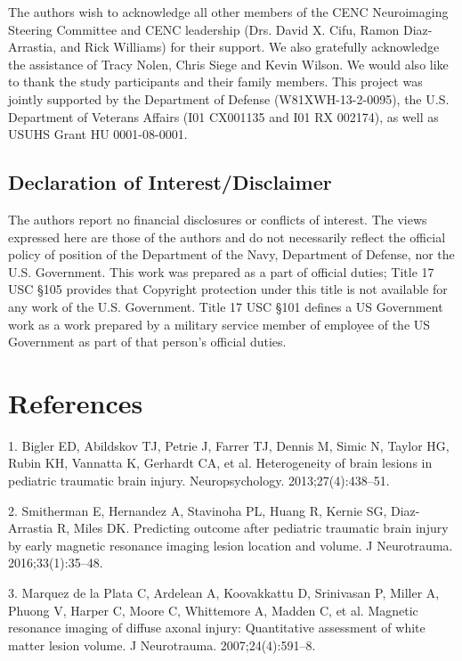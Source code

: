 \documentclass[11pt,]{article}
\begin{document}
The authors wish to acknowledge all other members of the CENC
Neuroimaging Steering Committee and CENC leadership (Drs. David X. Cifu,
Ramon Diaz-Arrastia, and Rick Williams) for their support. We also
gratefully acknowledge the assistance of Tracy Nolen, Chris Siege and
Kevin Wilson. We would also like to thank the study participants and
their family members. This project was jointly supported by the
Department of Defense (W81XWH-13-2-0095), the U.S. Department of
Veterans Affairs (I01 CX001135 and I01 RX 002174), as well as USUHS
Grant HU 0001-08-0001.

\subsection{Declaration of
Interest/Disclaimer}\label{declaration-of-interestdisclaimer}

The authors report no financial disclosures or conflicts of interest.
The views expressed here are those of the authors and do not necessarily
reflect the official policy of position of the Department of the Navy,
Department of Defense, nor the U.S. Government. This work was prepared
as a part of official duties; Title 17 USC §105 provides that Copyright
protection under this title is not available for any work of the U.S.
Government. Title 17 USC §101 defines a US Government work as a work
prepared by a military service member of employee of the US Government
as part of that person's official duties.

\clearpage

\section*{References}\label{references}

\hypertarget{refs}{}
\hypertarget{ref-Bigler:2013aa}{}
1. Bigler ED, Abildskov TJ, Petrie J, Farrer TJ, Dennis M, Simic N,
Taylor HG, Rubin KH, Vannatta K, Gerhardt CA, et al. Heterogeneity of
brain lesions in pediatric traumatic brain injury. Neuropsychology.
2013;27(4):438--51.

\hypertarget{ref-Smitherman:2016aa}{}
2. Smitherman E, Hernandez A, Stavinoha PL, Huang R, Kernie SG,
Diaz-Arrastia R, Miles DK. Predicting outcome after pediatric traumatic
brain injury by early magnetic resonance imaging lesion location and
volume. J Neurotrauma. 2016;33(1):35--48.

\hypertarget{ref-Marquez-de-la-Plata:2007aa}{}
3. Marquez de la Plata C, Ardelean A, Koovakkattu D, Srinivasan P,
Miller A, Phuong V, Harper C, Moore C, Whittemore A, Madden C, et al.
Magnetic resonance imaging of diffuse axonal injury: Quantitative
assessment of white matter lesion volume. J Neurotrauma.
2007;24(4):591--8.
\end{document}
